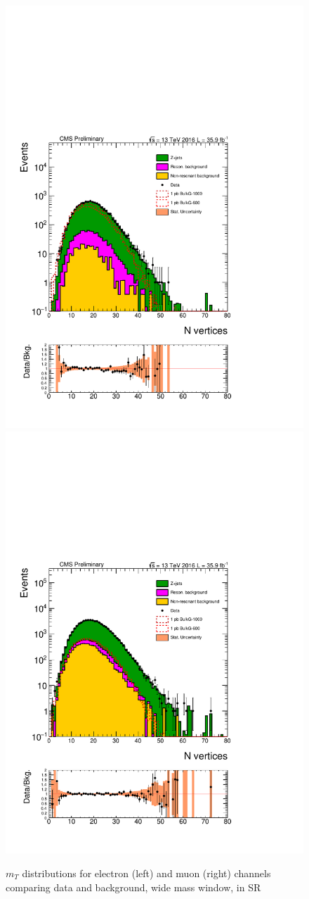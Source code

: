 \begin{figure}[htbp!]
\centering
\includegraphics[width=0.46\linewidth,page=3]{figures/ReMiniSummer16_DT_PhReMiniMCRcFixXsec_GMCPhPtWt_SRdPhiGT0p5_puWeightsummer16_muoneg_gjet_metfilter_unblind_el_log_1pb.pdf}
\includegraphics[width=0.46\linewidth,page=3]{figures/ReMiniSummer16_DT_PhReMiniMCRcFixXsec_GMCPhPtWt_SRdPhiGT0p5_puWeightsummer16_muoneg_gjet_metfilter_unblind_mu_log_1pb.pdf}
\caption{$m_T$ distributions for electron (left) and muon (right) channels
comparing data and background, 
wide mass window, in SR}
\label{fit:SR_gjet_mt_wide}
\end{figure}

